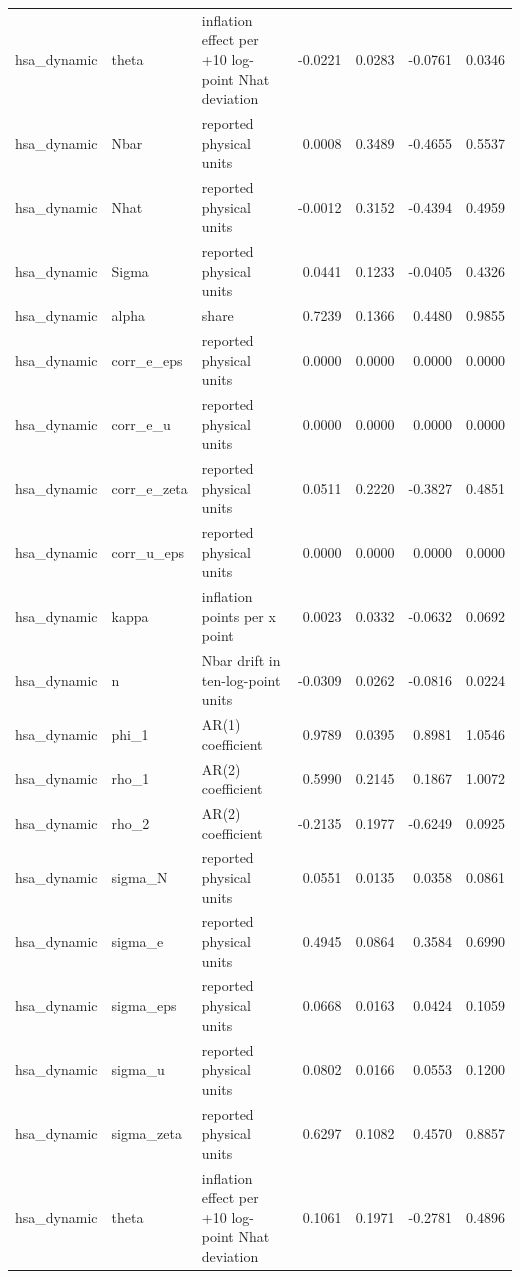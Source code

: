 \begin{tabular}{lllrrrr}
hsa\_dynamic & theta & inflation effect per +10 log-point Nhat deviation & -0.0221 & 0.0283 & -0.0761 & 0.0346 \\
hsa\_dynamic & Nbar & reported physical units & 0.0008 & 0.3489 & -0.4655 & 0.5537 \\
hsa\_dynamic & Nhat & reported physical units & -0.0012 & 0.3152 & -0.4394 & 0.4959 \\
hsa\_dynamic & Sigma & reported physical units & 0.0441 & 0.1233 & -0.0405 & 0.4326 \\
hsa\_dynamic & alpha & share & 0.7239 & 0.1366 & 0.4480 & 0.9855 \\
hsa\_dynamic & corr\_e\_eps & reported physical units & 0.0000 & 0.0000 & 0.0000 & 0.0000 \\
hsa\_dynamic & corr\_e\_u & reported physical units & 0.0000 & 0.0000 & 0.0000 & 0.0000 \\
hsa\_dynamic & corr\_e\_zeta & reported physical units & 0.0511 & 0.2220 & -0.3827 & 0.4851 \\
hsa\_dynamic & corr\_u\_eps & reported physical units & 0.0000 & 0.0000 & 0.0000 & 0.0000 \\
hsa\_dynamic & kappa & inflation points per x point & 0.0023 & 0.0332 & -0.0632 & 0.0692 \\
hsa\_dynamic & n & Nbar drift in ten-log-point units & -0.0309 & 0.0262 & -0.0816 & 0.0224 \\
hsa\_dynamic & phi\_1 & AR(1) coefficient & 0.9789 & 0.0395 & 0.8981 & 1.0546 \\
hsa\_dynamic & rho\_1 & AR(2) coefficient & 0.5990 & 0.2145 & 0.1867 & 1.0072 \\
hsa\_dynamic & rho\_2 & AR(2) coefficient & -0.2135 & 0.1977 & -0.6249 & 0.0925 \\
hsa\_dynamic & sigma\_N & reported physical units & 0.0551 & 0.0135 & 0.0358 & 0.0861 \\
hsa\_dynamic & sigma\_e & reported physical units & 0.4945 & 0.0864 & 0.3584 & 0.6990 \\
hsa\_dynamic & sigma\_eps & reported physical units & 0.0668 & 0.0163 & 0.0424 & 0.1059 \\
hsa\_dynamic & sigma\_u & reported physical units & 0.0802 & 0.0166 & 0.0553 & 0.1200 \\
hsa\_dynamic & sigma\_zeta & reported physical units & 0.6297 & 0.1082 & 0.4570 & 0.8857 \\
hsa\_dynamic & theta & inflation effect per +10 log-point Nhat deviation & 0.1061 & 0.1971 & -0.2781 & 0.4896 \\

\end{tabular}
